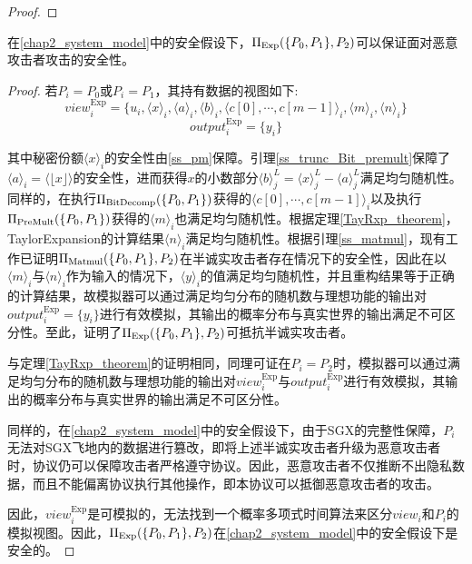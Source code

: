 \begin{proof}
%	
%	
%	
\end{proof}

\begin{theorem}
	\label{Exp_theorem}
	在\ref{chap2_system_model}中的安全假设下，$\Pi_{\rm Exp}(\{P_0, P_1\}, P_2)$可以保证面对恶意攻击者攻击的安全性。
\end{theorem}

\begin{proof}
	若$P_i=P_0$或$P_i=P_1$，其持有数据的视图如下:
	$$view_i^{\text{Exp}}=\{u_i, \langle x\rangle_i,\langle a\rangle_i, \langle b\rangle_i, \langle c[0],\cdots, c[m-1]\rangle_i,\langle m\rangle_i,\langle n\rangle_i\}$$
	$$output_i^{\text{Exp}}=\{y_i\}$$
	
	其中秘密份额$\langle x\rangle_i$的安全性由\ref{ss_pm}保障。引理\ref{ss_trunc_Bit_premult}保障了$\langle a\rangle_i=\langle \lfloor x \rfloor \rangle$的安全性，进而获得$x$的小数部分$\langle b\rangle_j^L = \langle x\rangle_j^L - \langle a\rangle_j^L$满足均匀随机性。同样的，在执行$\Pi_{\rm BitDecomp}(\{P_0, P_1\})$获得的$\langle c[0],\cdots, c[m-1]\rangle_i$以及执行$\Pi_{\rm PreMult}(\{P_0, P_1\})$获得的$\langle m\rangle_i$也满足均匀随机性。根据定理\ref{TayRxp_theorem}，TaylorExpansion的计算结果$\langle n\rangle_i$满足均匀随机性。根据引理\ref{ss_matmul}，现有工作已证明$\Pi_{\rm Matmul}(\{P_0, P_1\}, P_2)$在半诚实攻击者存在情况下的安全性，因此在以$\langle m\rangle_i$与$\langle n\rangle_i$作为输入的情况下，$\langle y\rangle_i$的值满足均匀随机性，并且重构结果等于正确的计算结果，故模拟器可以通过满足均匀分布的随机数与理想功能的输出对$output_i^{\text{Exp}}=\{y_i\}$进行有效模拟，其输出的概率分布与真实世界的输出满足不可区分性。至此，证明了$\Pi_{\rm Exp}(\{P_0, P_1\}, P_2)$可抵抗半诚实攻击者。
	
	与定理\ref{TayRxp_theorem}的证明相同，同理可证在$P_i=P_2$时，模拟器可以通过满足均匀分布的随机数与理想功能的输出对$view_i^{\text{Exp}}$与$output_i^{\text{Exp}}$进行有效模拟，其输出的概率分布与真实世界的输出满足不可区分性。
	
	同样的，在\ref{chap2_system_model}中的安全假设下，由于SGX的完整性保障\cite{SGX_Explained}，$P_i$无法对SGX飞地内的数据进行篡改，即将上述半诚实攻击者升级为恶意攻击者时，协议仍可以保障攻击者严格遵守协议。因此，恶意攻击者不仅推断不出隐私数据，而且不能偏离协议执行其他操作，即本协议可以抵御恶意攻击者的攻击。
	
	因此，$view_i^{\text{Exp}}$是可模拟的，无法找到一个概率多项式时间算法来区分$view_i$和$P_i$的模拟视图。因此，$\Pi_{\rm Exp}(\{P_0, P_1\}, P_2)$在\ref{chap2_system_model}中的安全假设下是安全的。
	
\end{proof}



